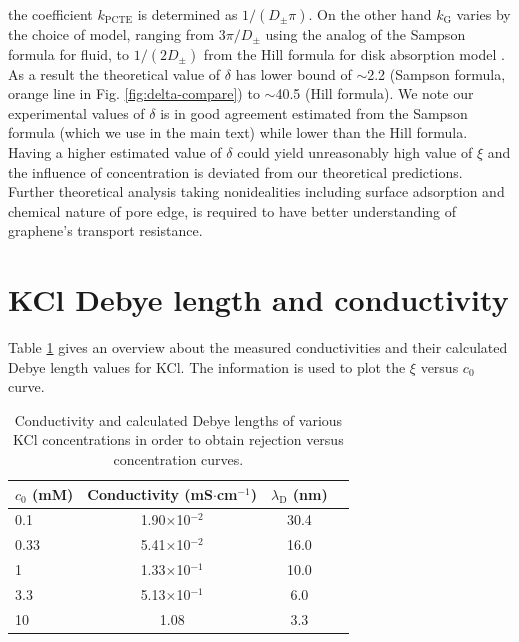 \documentclass[manuscript=suppinfo,email=true, hyperref=true, keywords=false]{achemso}
\newcommand{\Fig}{Fig.}
\begin{document}
the coefficient $k_{\mathrm{PCTE}}$ is determined as
$1/(D_{\mathrm{\pm}} \pi)$. On the other hand $k_{\mathrm{G}}$ varies
by the choice of model, ranging from $3 \pi / D_{\mathrm{\pm}}$ using
the analog of the Sampson formula for
fluid\cite{Roscoe_1949,Celebi_2014}, to $1/(2 D_{\mathrm{\pm}})$ from
the Hill formula for disk absorption model
\cite{Hill_1975,Grebenkov_2018}. As a result the theoretical value of
$\delta$ has lower bound of $\sim$2.2 (Sampson formula, orange line in
\Fig{} \ref{fig:delta-compare}) to $\sim$40.5 (Hill formula). We note
our experimental values of $\delta$ is in good agreement estimated
from the Sampson formula (which we use in the main text) while lower
than the Hill formula. Having a higher estimated value of $\delta$
could yield unreasonably high value of $\xi$ and the influence of
concentration is deviated from our theoretical predictions. Further
theoretical analysis taking nonidealities including surface adsorption
and chemical nature of pore edge, is required to have better
understanding of graphene's transport resistance.






\section{KCl Debye length and conductivity}
\label{sec:debye}
Table \ref{tab:debye} gives an overview about the measured
conductivities and their calculated Debye length values for KCl. The
information is used to plot the $\xi$ versus $c_{0}$ curve.

\begin{table}[htbp]
  \centering
  \begin{tabular}{lccc}
    \hline
    $c_{0}$ (mM) & Conductivity (mS$\cdot$cm$^{-1}$) & $\lambda_{\mathrm{D}}$ (nm)\\
    \hline
    0.1&        1.90$\times$10$^{-2}$ &        30.4\\
    0.33&       5.41$\times$10$^{-2}$ & 16.0\\
    1   &1.33$\times$10$^{-1}$ & 10.0\\
    3.3&     5.13$\times$10$^{-1}$ &  6.0\\
    10&      1.08    &3.3\\
    \hline
  \end{tabular}
  \caption{Conductivity and calculated Debye lengths of various KCl
    concentrations in order to obtain rejection versus
    concentration curves. }
  \label{tab:debye}
\end{table}
\end{document}
